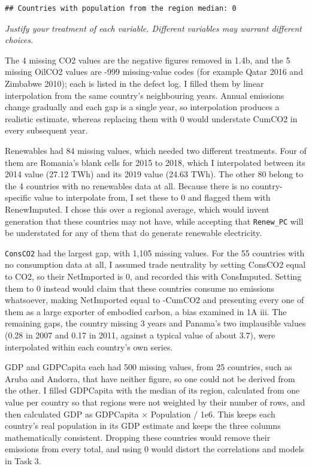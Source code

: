 \documentclass[
]{article}
\begin{document}
\begin{verbatim}
## Countries with population from the region median: 0
\end{verbatim}

\emph{Justify your treatment of each variable. Different variables may
warrant different choices.}

The 4 missing CO2 values are the negative figures removed in 1.4b, and
the 5 missing OilCO2 values are -999 missing-value codes (for example
Qatar 2016 and Zimbabwe 2010); each is listed in the defect log. I
filled them by linear interpolation from the same country's neighbouring
years. Annual emissions change gradually and each gap is a single year,
so interpolation produces a realistic estimate, whereas replacing them
with 0 would understate CumCO2 in every subsequent year.

Renewables had 84 missing values, which needed two different treatments.
Four of them are Romania's blank cells for 2015 to 2018, which I
interpolated between its 2014 value (27.12 TWh) and its 2019 value
(24.63 TWh). The other 80 belong to the 4 countries with no renewables
data at all. Because there is no country-specific value to interpolate
from, I set these to 0 and flagged them with RenewImputed. I chose this
over a regional average, which would invent generation that these
countries may not have, while accepting that \texttt{Renew\_PC} will be
understated for any of them that do generate renewable electricity.

\texttt{ConsCO2} had the largest gap, with 1,105 missing values. For the
55 countries with no consumption data at all, I assumed trade neutrality
by setting ConsCO2 equal to CO2, so their NetImported is 0, and recorded
this with ConsImputed. Setting them to 0 instead would claim that these
countries consume no emissions whatsoever, making NetImported equal to
-CumCO2 and presenting every one of them as a large exporter of embodied
carbon, a bias examined in 1A iii. The remaining gaps, the country
missing 3 years and Panama's two implausible values (0.28 in 2007 and
0.17 in 2011, against a typical value of about 3.7), were interpolated
within each country's own series.

GDP and GDPCapita each had 500 missing values, from 25 countries, such
as Aruba and Andorra, that have neither figure, so one could not be
derived from the other. I filled GDPCapita with the median of its
region, calculated from one value per country so that regions were not
weighted by their number of rows, and then calculated GDP as GDPCapita ×
Population / 1e6. This keeps each country's real population in its GDP
estimate and keeps the three columns mathematically consistent. Dropping
these countries would remove their emissions from every total, and using
0 would distort the correlations and models in Task 3.
\end{document}
